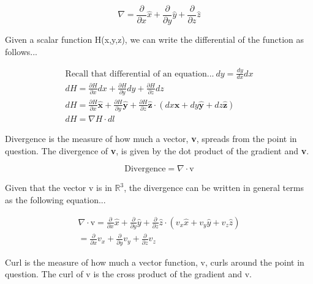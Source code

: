 	
	\begin{equation}
	\nabla{}=\frac{\partial{}}{\partial{x}}\hat{x} + \frac{\partial{}}{\partial{y}}\hat{y} + \frac{\partial{}}{\partial{z}}\hat{z}
	\end{equation}
	
	Given a scalar function H(x,y,z), we can write the differential of the function as follows...
	

	\begin{equation}
		\begin{gathered}
		\text{Recall that differential of an equation...} \ dy = \frac{dy}{dx}dx \\
		dH = \frac{\partial{H}}{\partial{x}}dx + \frac{\partial{H}}{\partial{y}}dy + \frac{\partial{H}}{\partial{z}}dz\\
		dH = \frac{\partial{H}}{\partial{x}}\mathbf{\hat{x}} + \frac{\partial{H}}{\partial{y}}\mathbf{\hat{y}} + \frac{\partial{H}}{\partial{z}}\mathbf{\hat{z}} \cdot (dx\mathbf{\hat{x}}+dy\mathbf{\hat{y}}+dz\mathbf{\hat{z}})\\
		\boxed{dH = \nabla{H} \cdot dl}
		\end{gathered}
	\end{equation}
	
	Divergence is the measure of how much a vector, \textbf{v}, spreads from the point in question. The divergence of \textbf{v}, is given by the dot product of the gradient and \textbf{v}.
	
	\begin{equation}
	\text{Divergence} = \nabla{} \cdot \mathbf{\mathrm{v}}
	\end{equation}
	
	Given that the vector v is in \( \mathbb{R}^3 \), the divergence can be written in general terms as the following equation...
	

\begin{equation}
	\begin{gathered}
	\nabla{} \cdot \mathbf{\mathrm{v}} = \frac{\partial{}}{\partial{x}}\hat{x} + \frac{\partial{}}{\partial{y}}\hat{y} + \frac{\partial{}}{\partial{z}}\hat{z} \cdot (v_x\hat{x} + v_y\hat{y}+v_z\hat{z})\\
	= \frac{\partial{}}{\partial{x}}v_x + \frac{\partial{}}{\partial{y}}v_y+ \frac{\partial{}}{\partial{z}}v_z
	\end{gathered}
\end{equation}

Curl is the measure of how much a vector function, v, curls around the point in question. The curl of v is the cross product of the gradient and v. 



